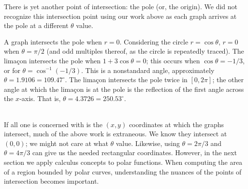 {There is yet another point of intersection: the pole (or, the origin). We did not recognize this intersection point using our work above as each graph arrives at the pole at a different $\theta$ value.

A graph intersects the pole when $r=0$. Considering the circle $r=\cos\theta$, $r=0$ when $\theta = \pi/2$ (and odd multiples thereof, as the circle is repeatedly traced). The lima\c con intersects the pole when $1+3\cos\theta =0$; this occurs when $\cos \theta = -1/3$, or for $\theta = \cos^{-1}(-1/3)$. This is a nonstandard angle, approximately $\theta = 1.9106 = 109.47^\circ$. The lima\c con intersects the pole twice in $[0,2\pi]$; the other angle at which the lima\c con is at the pole is the reflection of the first angle across the $x$-axis. That is, $\theta = 4.3726 = 250.53^\circ.$
}\\

If all one is concerned with is the $(x,y)$ coordinates at which the graphs intersect, much of the above work is extraneous. We know they intersect at $(0,0)$; we might not care at what $\theta$ value. Likewise, using $\theta =2\pi/3$ and $\theta=4\pi/3$ can give us the needed rectangular coordinates. However, in the next section we apply calculus concepts to polar functions. When computing the area of a region bounded by polar curves, understanding the nuances of the points of intersection becomes important.

